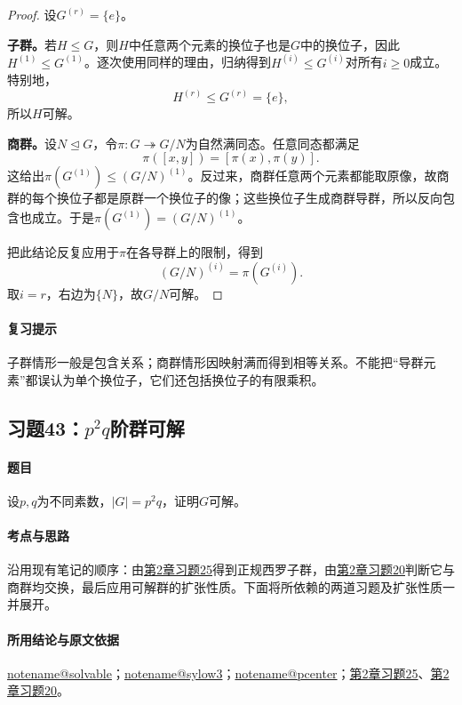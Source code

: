 \documentclass[UTF8,a4paper,11pt,fontset=windows]{ctexart}
\makeatletter
\newcommand{\noteref}[1]{\hyperref[note:#1]{\csname notename@#1\endcsname}}
\newcommand{\exref}[2]{\hyperref[ex:#1:#2]{第#1章习题#2}}
\makeatother
\begin{document}

\begin{proof}
设$G^{(r)}=\{e\}$。

\textbf{子群。}若$H\le G$，则$H$中任意两个元素的换位子也是$G$中的换位子，因此$H^{(1)}\le G^{(1)}$。逐次使用同样的理由，归纳得到$H^{(i)}\le G^{(i)}$对所有$i\ge0$成立。特别地，
\[
H^{(r)}\le G^{(r)}=\{e\},
\]
所以$H$可解。

\textbf{商群。}设$N\trianglelefteq G$，令$\pi:G\twoheadrightarrow G/N$为自然满同态。任意同态都满足
\[
\pi([x,y])=[\pi(x),\pi(y)].
\]
这给出$\pi(G^{(1)})\le(G/N)^{(1)}$。反过来，商群任意两个元素都能取原像，故商群的每个换位子都是原群一个换位子的像；这些换位子生成商群导群，所以反向包含也成立。于是$\pi(G^{(1)})=(G/N)^{(1)}$。

把此结论反复应用于$\pi$在各导群上的限制，得到
\[
(G/N)^{(i)}=\pi(G^{(i)}).
\]
取$i=r$，右边为$\{N\}$，故$G/N$可解。
\end{proof}

\paragraph{复习提示}
子群情形一般是包含关系；商群情形因映射满而得到相等关系。不能把“导群元素”都误认为单个换位子，它们还包括换位子的有限乘积。


\subsection{习题43：\texorpdfstring{$p^2q$阶群可解}{p2q阶群可解}}
\label{ex:2:43}

\paragraph{题目}
设$p,q$为不同素数，$|G|=p^2q$，证明$G$可解。

\paragraph{考点与思路}
沿用现有笔记的顺序：由\exref{2}{25}得到正规西罗子群，由\exref{2}{20}判断它与商群均交换，最后应用可解群的扩张性质。下面将所依赖的两道习题及扩张性质一并展开。

\paragraph{所用结论与原文依据}
\noteref{solvable}；\noteref{sylow3}；\noteref{pcenter}；\exref{2}{25}、\exref{2}{20}。
\end{document}
